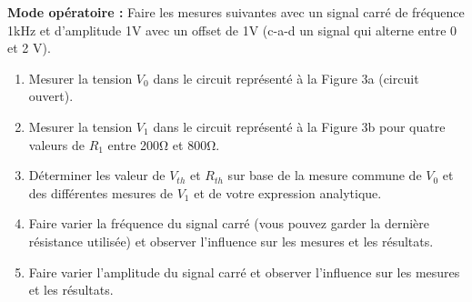 \documentclass{exam}
\begin{document}
\begin{framed}
	\begin{minipage}[t]{0.9\textwidth}
		\textbf{Mode opératoire :}
		Faire les mesures suivantes avec un signal carré de fréquence 1kHz et d’amplitude 1V avec un
		offset de 1V (c-a-d un signal qui alterne entre 0 et 2 V).
		\begin{enumerate}
			\item Mesurer la tension $V_0$ dans le circuit représenté à la Figure 3a (circuit ouvert).
			\item Mesurer la tension $V_1$ dans le circuit représenté à la Figure 3b pour quatre valeurs de $R_1$ entre
			      200Ω et 800Ω.
			\item Déterminer les valeur de $V_{th}$ et $R_{th}$ sur base de la mesure commune de $V_0$ et des différentes
			      mesures de $V_1$ et de votre expression analytique.
			\item Faire varier la fréquence du signal carré (vous pouvez garder la dernière résistance utilisée) et
			      observer l’influence sur les mesures et les résultats.
			\item Faire varier l’amplitude du signal carré et observer l’influence sur les mesures et les résultats.
		\end{enumerate}
	\end{minipage}
\end{framed}
\end{document}
